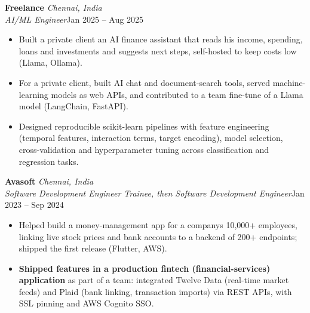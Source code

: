 \documentclass[a4paper,11pt]{article}
\newcommand{\role}[4]{%
  \textbf{#1}{\color{muted}\,\textperiodcentered\,\textit{#2}}\\
  \textit{#4}\hfill{\color{muted}#3}\par}
\newcommand{\gap}{\vspace{5pt}}
\newcommand{\num}[1]{\textbf{#1}}   %
\begin{document}
\gap
{}
\role{Freelance}{Chennai, India}{Jan 2025 – Aug 2025}{AI/ML Engineer}
\begin{itemize}
  \item Built a private client an AI finance assistant that reads his income, spending, loans and investments and suggests next steps, self-hosted to keep costs low (Llama, Ollama).
  \item For a private client, built AI chat and document-search tools, served machine-learning models as web APIs, and contributed to a team fine-tune of a Llama model (LangChain, FastAPI).
  \item Designed reproducible scikit-learn pipelines with feature engineering (temporal features, interaction terms, target encoding), model selection, cross-validation and hyperparameter tuning across classification and regression tasks.
\end{itemize}
\gap
{}
\role{Avasoft}{Chennai, India}{Jan 2023 – Sep 2024}{Software Development Engineer Trainee, then Software Development Engineer}
\begin{itemize}
  \item Helped build a money-management app for a company\textquotesingle{}s 10,000+ employees, linking live stock prices and bank accounts to a backend of 200+ endpoints; shipped the first release (Flutter, AWS).
  \item \num{Shipped features in a production fintech (financial-services) application} as part of a team: integrated Twelve Data (real-time market feeds) and Plaid (bank linking, transaction imports) via REST APIs, with SSL pinning and AWS Cognito SSO.
\end{itemize}
\end{document}
